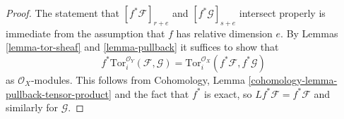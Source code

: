\documentclass[10pt,a4paper]{amsart}
\theoremstyle{plain}
\theoremstyle{definition}
\theoremstyle{remark}
\numberwithin{equation}{subsection}
\begin{document}
\begin{proof}
The statement that $[f^*\mathcal{F}]_{r + e}$ and $[f^*\mathcal{G}]_{s + e}$
intersect properly is immediate from the assumption that $f$ has
relative dimension $e$. By
Lemmas \ref{lemma-tor-sheaf} and \ref{lemma-pullback}
it suffices to show that
$$
f^*\text{Tor}_i^{\mathcal{O}_Y}(\mathcal{F}, \mathcal{G}) =
\text{Tor}_i^{\mathcal{O}_X}(f^*\mathcal{F}, f^*\mathcal{G})
$$
as $\mathcal{O}_X$-modules. This follows from
Cohomology, Lemma \ref{cohomology-lemma-pullback-tensor-product}
and the fact that $f^*$ is exact, so $Lf^*\mathcal{F} = f^*\mathcal{F}$
and similarly for $\mathcal{G}$.
\end{proof}
\end{document}
